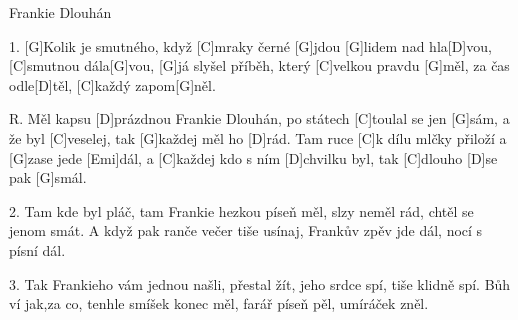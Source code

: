 \begin{song}{Frankie Dlouhán}{}

\begin{xverse}{1. }
[G]Kolik je smutného, když [C]mraky černé [G]jdou
[G]lidem nad hla[D]vou, [C]smutnou dála[G]vou,
[G]já slyšel příběh, který [C]velkou pravdu [G]měl,
za čas odle[D]těl, [C]každý zapom[G]něl.
\end{xverse}

\begin{xverse}{R. }
Měl kapsu [D]prázdnou Frankie Dlouhán,
po státech [C]toulal se jen [G]sám,
a že byl [C]veselej, tak [G]každej měl ho [D]rád.
Tam ruce [C]k dílu mlčky přiloží a [G]zase jede [Emi]dál,
a [C]každej kdo s ním [D]chvilku byl,
tak [C]dlouho [D]se pak [G]smál.
\end{xverse}

\begin{xverse}{2. }
Tam kde byl pláč, tam Frankie hezkou píseň měl,
slzy neměl rád, chtěl se jenom smát.
A když pak ranče večer tiše usínaj,
Frankův zpěv jde dál, nocí s písní dál.
\end{xverse}

\begin{xverse}{3. }
Tak Frankieho vám jednou našli, přestal žít,
jeho srdce spí, tiše klidně spí.
Bůh ví jak,za co, tenhle smíšek konec měl,
farář píseň pěl, umíráček zněl.
\end{xverse}

\end{song}

%
%
%
%
%
%
%
%
%

